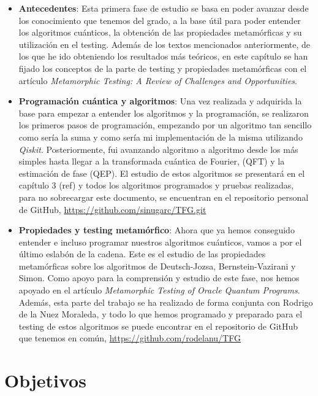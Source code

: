 \begin{itemize}
    \item \textbf{Antecedentes}: Esta primera fase de estudio se basa en poder avanzar desde los conocimiento que tenemos del grado, a la base útil para poder entender los algoritmos cuánticos, la obtención de las propiedades metamórficas y su utilización en el testing. Además de los textos mencionados anteriormente, de los que he ido obteniendo los resultados más teóricos, en este capítulo se han fijado los conceptos de la parte de testing y propiedades metamórficas con el artículo \textit{Metamorphic Testing: A Review of Challenges and Opportunities}\cite{AR:MTmain:2008}.
    
    \item \textbf{Programación cuántica y algoritmos}: Una vez realizada y adquirida la base para empezar a entender los algoritmos y la programación, se realizaron los primeros pasos de programación, empezando por un algoritmo tan sencillo como sería la suma y como sería mi implementación de la misma utilizando \textit{Qiskit}. Posteriormente, fui avanzando algoritmo a algoritmo desde los más simples hasta llegar a la transformada cuántica de Fourier, (QFT) y la estimación de fase (QEP). El estudio de estos algoritmos se presentará en el capítulo 3 (ref) y todos los algoritmos programados y pruebas realizadas, para no sobrecargar este documento, se encuentran en el repositorio personal de GitHub, \url{https://github.com/sinugarc/TFG.git}
    
    \item \textbf{Propiedades y testing metamórfico}: Ahora que ya hemos conseguido entender e incluso programar nuestros algoritmos cuánticos, vamos a por el último eslabón de la cadena. Este es el estudio de las propiedades metamórficas sobre los algoritmos de Deutsch-Jozsa, Bernstein-Vazirani y Simon. Como apoyo para la comprensión y estudio de este fase, nos hemos apoyado en el artículo \textit{Metamorphic Testing of Oracle Quantum Programs}\cite{metamorphicAdd:2022}. Además, esta parte del trabajo se ha realizado de forma conjunta con Rodrigo de la Nuez Moraleda, y todo lo que hemos programado y preparado para el testing de estos algoritmos se puede encontrar en el repositorio de GitHub que tenemos en común, \url{https://github.com/rodelanu/TFG}
\end{itemize}

\section{Objetivos}

